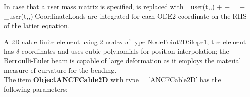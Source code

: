     In case that a user mass matrix is specified,  is replaced with
    \be
      \Mm_{user}(t,\qv,\dot \qv) \ddot \qv + \Dm \dot \qv + \Km \qv = \fv + \fv_{user}(t,\qv,\dot \qv)
    \ee
    CoordinateLoads are integrated for each ODE2 coordinate on the RHS of the latter equation.
\newpage

A 2D cable finite element using 2 nodes of type NodePoint2DSlope1; the element has 8 coordinates and uses cubic polynomials for position interpolation; the Bernoulli-Euler beam is capable of large deformation as it employs the material measure of curvature for the bending.
 \\\vspace{12pt} \noindent The item {\bf ObjectANCFCable2D} with type = 'ANCFCable2D' has the following parameters:\vspace{-1cm}\\ 
